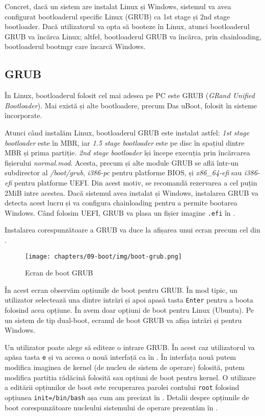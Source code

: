 Concret, dacă un sistem are instalat Linux și Windows, sistemul va avea configurat
bootloaderul specific Linux (GRUB) ca 1st stage și 2nd stage bootloader. Dacă
utilizatorul va opta să booteze în Linux, atunci bootloaderul GRUB va încărca
Linux; altfel, bootloaderul GRUB va încărca, prin chainloading, bootloaderul
bootmgr care încarcă Windows.

\subsection{GRUB}
\label{sec:boot:bootloader:grub}

În Linux, bootloaderul folosit cel mai adesea pe PC este GRUB (\textit{GRand Unified
Bootloader}). Mai există și alte bootloadere, precum Das uBoot, folosit în
sisteme încorporate.

Atunci când instalăm Linux, bootloaderul GRUB este instalat astfel: \textit{1st
stage bootloader} este în MBR, iar \textit{1.5 stage bootloader} este pe disc în spațiul dintre MBR și prima partiție.
\textit{2nd stage bootloader} își începe execuția prin încărcarea fișierului \textit{normal.mod}.
Acesta, precum și alte module GRUB se află într-un subdirector al \textit{/boot/grub}, \textit{i386-pc} pentru
platforme BIOS, și \textit{x86_64-efi} sau \textit{i386-efi} pentru platforme UEFI.
Din acest motiv, se recomandă rezervarea a cel puțin 2MiB intre acestea.
Dacă sistemul avea instalat și Windows, instalarea GRUB va
detecta acest lucru și va configura chainloading pentru a permite bootarea
Windows. Când folosim UEFI, GRUB va plasa un fișier imagine \texttt{.efi} în
.

Instalarea corespunzătoare a GRUB va duce la afișarea unui ecran precum cel din .

\begin{figure}[!htbp]
  \centering
  \texttt{[image: chapters/09-boot/img/boot-grub.png]}
  \caption{Ecran de boot GRUB}
  \label{fig:boot:boot-grub}
\end{figure}

În acest ecran observăm opțiunile de boot pentru GRUB. În mod tipic, un
utilizator selectează una dintre intrări și apoi apasă tasta \texttt{Enter} pentru a
boota folosind acea opțiune. În  avem doar opțiuni de boot pentru Linux (Ubuntu). Pe un sistem de tip dual-boot, ecranul de boot GRUB va afișa intrări și pentru Windows.

Un utilizator poate alege să editeze o intrare GRUB. În acest caz utilizatorul
va apăsa tasta \texttt{e} și va accesa o nouă interfață ca în .
În interfața nouă putem modifica imaginea de kernel (de nucleu de sistem de operare)
folosită, putem modifica partiția rădăcină folosită sau opțiuni de boot pentru
kernel. O utilizare a editării opțiunilor de boot este recuperarea parolei
contului \texttt{root} folosind opțiunea \texttt{init=/bin/bash} așa cum am precizat în
. Detalii despre
opțiunile de boot corespunzătoare nucleului sistemului de operare prezentăm în
.

